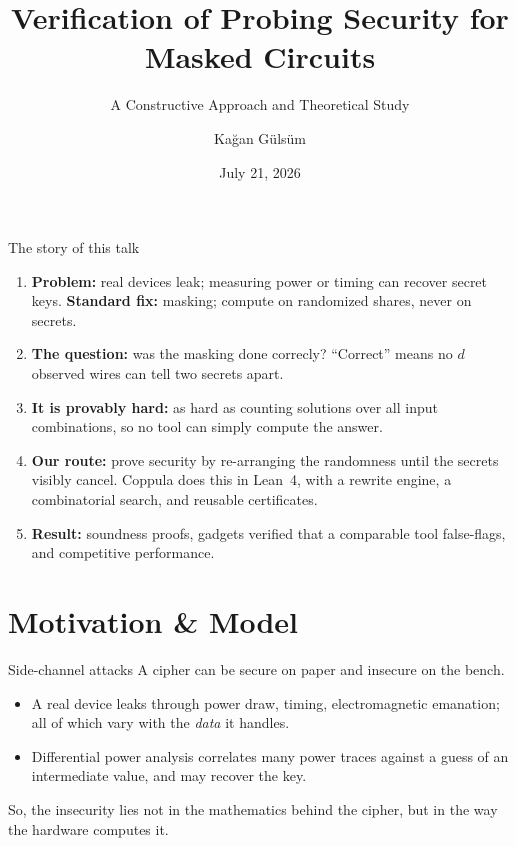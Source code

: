 \documentclass[aspectratio=169,10pt]{beamer}
\title{Verification of Probing Security for Masked Circuits}
\subtitle{A Constructive Approach and Theoretical Study}
\author{Kağan Gülsüm}
\institute{Sabancı University --- M.Sc. Thesis Defense\\{\scriptsize Supervisor: \textit{Asst. Prof. Süha Orhun Mutluergil}}}
\date{July 21, 2026}
\newcommand{\toolname}{Coppula}
\begin{document}
\maketitle

\begin{frame}{The story of this talk}
  \begin{enumerate}
    \item<1-> \textbf{Problem:} real devices leak; measuring power or timing
      can recover secret keys. \textbf{Standard fix:} masking; compute on
      randomized shares, never on secrets.
    \item<2-> \textbf{The question:} was the masking done correcly? ``Correct''
      means no $d$ observed wires can tell two secrets apart.
    \item<3-> \textbf{It is provably hard:} as hard as counting solutions over
      all input combinations, so no tool can simply compute the answer.
    \item<4-> \textbf{Our route:} prove security by re-arranging the
      randomness until the secrets visibly cancel. \toolname{} does this in
      Lean~4, with a rewrite engine, a combinatorial search, and reusable
      certificates.
    \item<5-> \textbf{Result:} soundness proofs, gadgets verified that a
      comparable tool false-flags, and competitive performance.
  \end{enumerate}
\end{frame}

\section{Motivation \& Model}

\begin{frame}{Side-channel attacks}
  A cipher can be secure on paper and insecure on the bench.
  \begin{itemize}
    \item A real device leaks through power draw, timing, electromagnetic
      emanation; all of which vary with the \emph{data} it handles.
    \item Differential power analysis \parencite{kocher1999differential} correlates many power
      traces against a guess of an intermediate value, and may recover the key.
  \end{itemize}
  \medskip
  \begin{alertblock}{}
    So, the insecurity lies not in the mathematics behind the cipher, but in the way
    the hardware computes it.
  \end{alertblock}
\end{frame}
\end{document}
